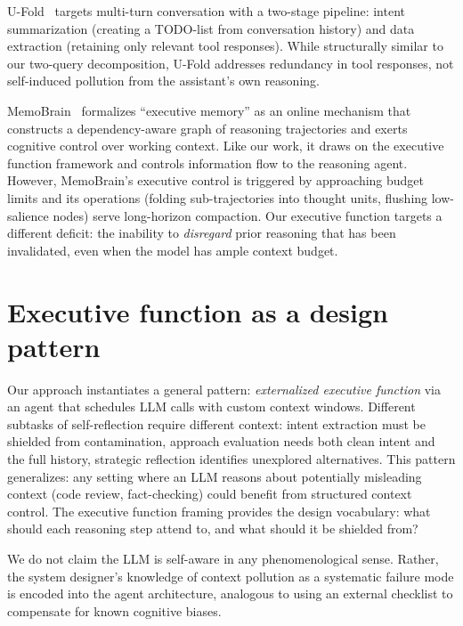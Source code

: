 \documentclass{article} %
\begin{document}
U-Fold~\citep{ye2025ufold} targets multi-turn conversation with a two-stage pipeline: intent summarization (creating a TODO-list from conversation history) and data extraction (retaining only relevant tool responses). While structurally similar to our two-query decomposition, U-Fold addresses redundancy in tool responses, not self-induced pollution from the assistant's own reasoning.

MemoBrain~\citep{qian2026memobrain} formalizes ``executive memory'' as an online mechanism that constructs a dependency-aware graph of reasoning trajectories and exerts cognitive control over working context. Like our work, it draws on the executive function framework and controls information flow to the reasoning agent. However, MemoBrain's executive control is triggered by approaching budget limits and its operations (folding sub-trajectories into thought units, flushing low-salience nodes) serve long-horizon compaction. Our executive function targets a different deficit: the inability to \emph{disregard} prior reasoning that has been invalidated, even when the model has ample context budget.

\section{Executive function as a design pattern}
\label{app:exec-function-pattern}

Our approach instantiates a general pattern: \emph{externalized executive function} via an agent that schedules LLM calls with custom context windows. Different subtasks of self-reflection require different context: intent extraction must be shielded from contamination, approach evaluation needs both clean intent and the full history, strategic reflection identifies unexplored alternatives. This pattern generalizes: any setting where an LLM reasons about potentially misleading context (code review, fact-checking) could benefit from structured context control. The executive function framing provides the design vocabulary: what should each reasoning step attend to, and what should it be shielded from?

We do not claim the LLM is self-aware in any phenomenological sense. Rather, the system designer's knowledge of context pollution as a systematic failure mode is encoded into the agent architecture, analogous to using an external checklist to compensate for known cognitive biases.

%
\end{document}
